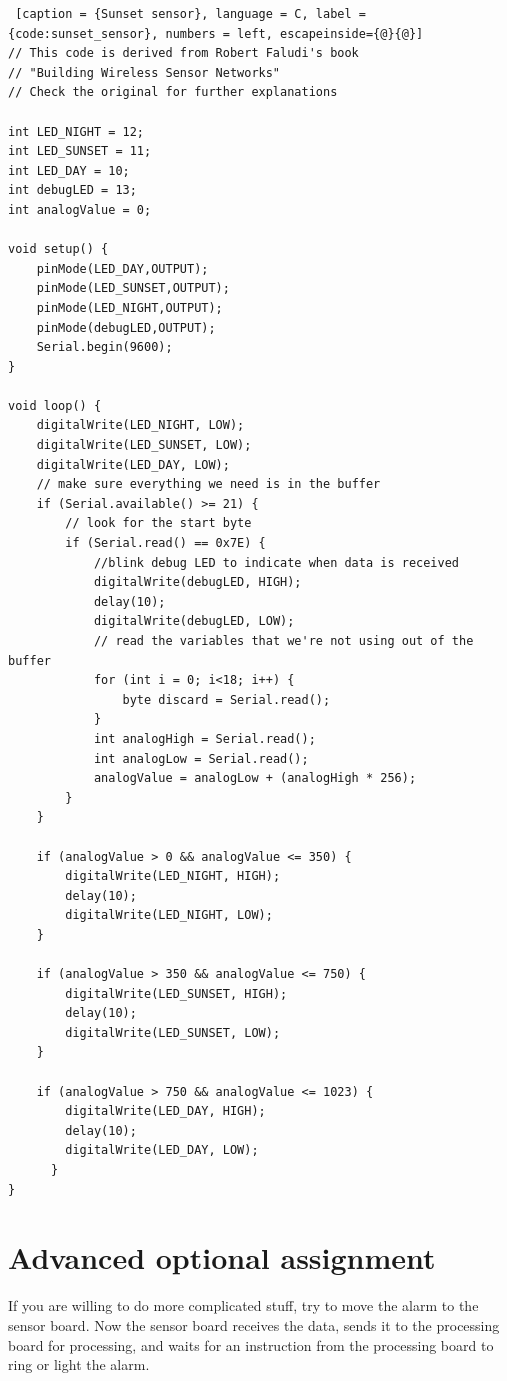 \begin{lstlisting} [caption = {Sunset sensor}, language = C, label = {code:sunset_sensor}, numbers = left, escapeinside={@}{@}]
// This code is derived from Robert Faludi's book
// "Building Wireless Sensor Networks"
// Check the original for further explanations

int LED_NIGHT = 12;
int LED_SUNSET = 11;
int LED_DAY = 10;
int debugLED = 13;
int analogValue = 0;

void setup() {
    pinMode(LED_DAY,OUTPUT);
    pinMode(LED_SUNSET,OUTPUT);
    pinMode(LED_NIGHT,OUTPUT);
    pinMode(debugLED,OUTPUT);
    Serial.begin(9600);
}

void loop() {
    digitalWrite(LED_NIGHT, LOW);
    digitalWrite(LED_SUNSET, LOW);
    digitalWrite(LED_DAY, LOW);
    // make sure everything we need is in the buffer
    if (Serial.available() >= 21) {
        // look for the start byte
        if (Serial.read() == 0x7E) {
            //blink debug LED to indicate when data is received
            digitalWrite(debugLED, HIGH);
            delay(10);
            digitalWrite(debugLED, LOW);
            // read the variables that we're not using out of the buffer
            for (int i = 0; i<18; i++) {
                byte discard = Serial.read();
            }
            int analogHigh = Serial.read();
            int analogLow = Serial.read();
            analogValue = analogLow + (analogHigh * 256);
        }
    }

    if (analogValue > 0 && analogValue <= 350) {
        digitalWrite(LED_NIGHT, HIGH);
        delay(10);
        digitalWrite(LED_NIGHT, LOW);
    }

    if (analogValue > 350 && analogValue <= 750) {
        digitalWrite(LED_SUNSET, HIGH);
        delay(10);
        digitalWrite(LED_SUNSET, LOW);
    }

    if (analogValue > 750 && analogValue <= 1023) {
        digitalWrite(LED_DAY, HIGH);
        delay(10);
        digitalWrite(LED_DAY, LOW);
      }
}
\end{lstlisting}


\section{Advanced optional assignment}

If you are willing to do more complicated stuff, try to move the alarm to the sensor board. 
Now the sensor board receives the data, sends it to the processing board for processing, and waits for an instruction from the processing board to ring or light the alarm.


